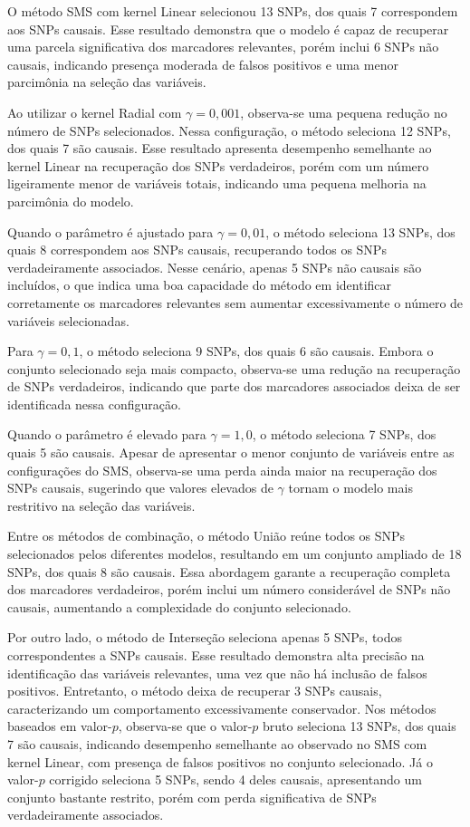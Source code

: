 \documentclass[12pt,a4paper]{article}
\begin{document}
O método SMS com kernel Linear selecionou 13 SNPs, dos quais 7 correspondem aos SNPs causais. Esse resultado demonstra que o modelo é capaz de recuperar uma parcela significativa dos marcadores relevantes, porém inclui 6 SNPs não causais, indicando presença moderada de falsos positivos e uma menor parcimônia na seleção das variáveis.

Ao utilizar o kernel Radial com $\gamma = 0{,}001$, observa-se uma pequena redução no número de SNPs selecionados. Nessa configuração, o método seleciona 12 SNPs, dos quais 7 são causais. Esse resultado apresenta desempenho semelhante ao kernel Linear na recuperação dos SNPs verdadeiros, porém com um número ligeiramente menor de variáveis totais, indicando uma pequena melhoria na parcimônia do modelo.

Quando o parâmetro é ajustado para $\gamma = 0{,}01$, o método seleciona 13 SNPs, dos quais 8 correspondem aos SNPs causais, recuperando todos os SNPs verdadeiramente associados. Nesse cenário, apenas 5 SNPs não causais são incluídos, o que indica uma boa capacidade do método em identificar corretamente os marcadores relevantes sem aumentar excessivamente o número de variáveis selecionadas.

Para $\gamma = 0{,}1$, o método seleciona 9 SNPs, dos quais 6 são causais. Embora o conjunto selecionado seja mais compacto, observa-se uma redução na recuperação de SNPs verdadeiros, indicando que parte dos marcadores associados deixa de ser identificada nessa configuração.

Quando o parâmetro é elevado para $\gamma = 1{,}0$, o método seleciona 7 SNPs, dos quais 5 são causais. Apesar de apresentar o menor conjunto de variáveis entre as configurações do SMS, observa-se uma perda ainda maior na recuperação dos SNPs causais, sugerindo que valores elevados de $\gamma$ tornam o modelo mais restritivo na seleção das variáveis.

Entre os métodos de combinação, o método União reúne todos os SNPs selecionados pelos diferentes modelos, resultando em um conjunto ampliado de 18 SNPs, dos quais 8 são causais. Essa abordagem garante a recuperação completa dos marcadores verdadeiros, porém inclui um número considerável de SNPs não causais, aumentando a complexidade do conjunto selecionado.

Por outro lado, o método de Interseção seleciona apenas 5 SNPs, todos correspondentes a SNPs causais. Esse resultado demonstra alta precisão na identificação das variáveis relevantes, uma vez que não há inclusão de falsos positivos. Entretanto, o método deixa de recuperar 3 SNPs causais, caracterizando um comportamento excessivamente conservador. Nos métodos baseados em valor-$p$, observa-se que o valor-$p$ bruto seleciona 13 SNPs, dos quais 7 são causais, indicando desempenho semelhante ao observado no SMS com kernel Linear, com presença de falsos positivos no conjunto selecionado. Já o valor-$p$ corrigido seleciona 5 SNPs, sendo 4 deles causais, apresentando um conjunto bastante restrito, porém com perda significativa de SNPs verdadeiramente associados.
\end{document}
